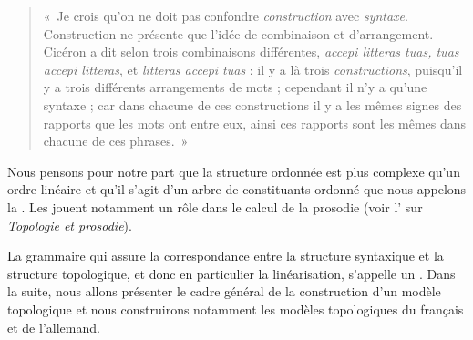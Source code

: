 \begin{quote}
    «~Je crois qu’on ne doit pas confondre \textit{construction} avec \textit{syntaxe}. Construction ne présente que l’idée de combinaison et d’arrangement. Cicéron a dit selon trois combinaisons différentes, \textit{accepi litteras tuas, tuas accepi litteras}, et \textit{litteras accepi tuas} : il y a là trois \textit{constructions}, puisqu’il y a trois différents arrangements de mots ; cependant il n’y a qu’une syntaxe ; car dans chacune de ces constructions il y a les mêmes signes des rapports que les mots ont entre eux, ainsi ces rapports sont les mêmes dans chacune de ces phrases.~»
\end{quote}

Nous pensons pour notre part que la structure ordonnée est plus complexe qu’un ordre linéaire et qu’il s’agit d’un arbre de constituants ordonné que nous appelons la . Les  jouent notamment un rôle dans le calcul de la prosodie (voir l’ sur \textit{Topologie et prosodie}).

La grammaire qui assure la correspondance entre la structure syntaxique et la structure topologique, et donc en particulier la linéarisation, s’appelle un . Dans la suite, nous allons présenter le cadre général de la construction d’un modèle topologique et nous construirons notamment les modèles topologiques du français et de l’allemand.

